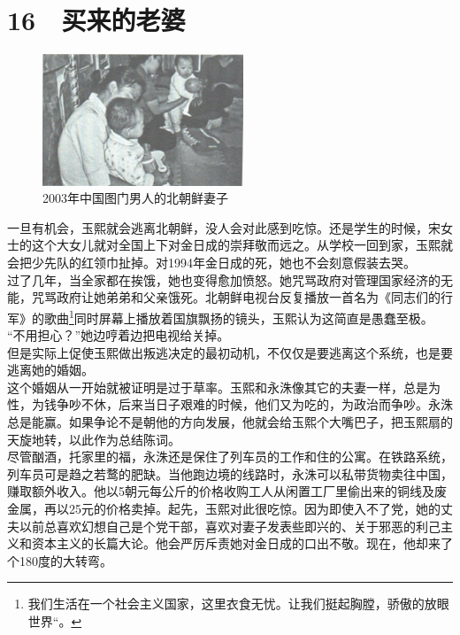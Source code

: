 \fancyhead[RO]{\thepage}
\fancyhead[LE]{\thepage}
\fancyfoot[LE,RO]{}
\fancyfoot[LO,CE]{}
\fancyfoot[CO,RE]{}
\chapter*{16 {\FA } 买来的老婆}
\begin{figure}[!htbp]
\centering
\includegraphics[width=6cm]{./Chapters/Images/16.jpg}
\caption*{2003年中国图门男人的北朝鲜妻子}
\end{figure}


一旦有机会，玉熙就会逃离北朝鲜，没人会对此感到吃惊。还是学生的时候，宋女士的这个大女儿就对全国上下对金日成的崇拜敬而远之。从学校一回到家，玉熙就会把少先队的红领巾扯掉。对1994年金日成的死，她也不会刻意假装去哭。\\

过了几年，当全家都在挨饿，她也变得愈加愤怒。她咒骂政府对管理国家经济的无能，咒骂政府让她弟弟和父亲饿死。北朝鲜电视台反复播放一首名为《同志们的行军》的歌曲\footnote{我们生活在一个社会主义国家，这里衣食无忧。让我们挺起胸膛，骄傲的放眼世界“。}同时屏幕上播放着国旗飘扬的镜头，玉熙认为这简直是愚蠢至极。\\

“不用担心？”她边哼着边把电视给关掉。\\

但是实际上促使玉熙做出叛逃决定的最初动机，不仅仅是要逃离这个系统，也是要逃离她的婚姻。\\

这个婚姻从一开始就被证明是过于草率。玉熙和永洙像其它的夫妻一样，总是为性，为钱争吵不休，后来当日子艰难的时候，他们又为吃的，为政治而争吵。永洙总是能赢。如果争论不是朝他的方向发展，他就会给玉熙个大嘴巴子，把玉熙扇的天旋地转，以此作为总结陈词。\\

尽管酗酒，托家里的福，永洙还是保住了列车员的工作和住的公寓。在铁路系统，列车员可是趋之若鹜的肥缺。当他跑边境的线路时，永洙可以私带货物卖往中国，赚取额外收入。他以5朝元每公斤的价格收购工人从闲置工厂里偷出来的铜线及废金属，再以25元的价格卖掉。起先，玉熙对此很吃惊。因为即使入不了党，她的丈夫以前总喜欢幻想自己是个党干部，喜欢对妻子发表些即兴的、关于邪恶的利己主义和资本主义的长篇大论。他会严厉斥责她对金日成的口出不敬。现在，他却来了个180度的大转弯。\\

